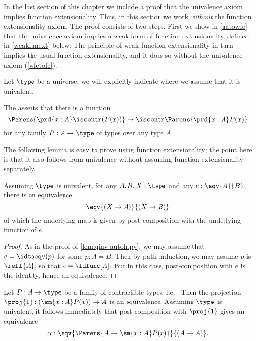 %
In the last section of this chapter we include a proof that the univalence axiom implies function
extensionality. Thus, in this section we work \emph{without} the function extensionality axiom.
The proof consists of two steps. First we show
in \cref{uatowfe} that the univalence
axiom implies a weak form of function extensionality, defined in \cref{weakfunext} below. The
principle of weak function extensionality in turn implies the usual function extensionality,
and it does so without the univalence axiom (\cref{wfetofe}).

%
Let $\type$ be a universe; we will explicitly indicate where we assume that it is univalent.

\begin{defn}\label{weakfunext}
The 
%
asserts that there is a function
\begin{equation*}
\Parens{\prd{x:A}\iscontr(P(x))} \to\iscontr\Parens{\prd{x:A}P(x)}
\end{equation*}
for any family $P:A\to\type$ of types over any type $A$.
\end{defn}

The following lemma is easy to prove using function extensionality; the point here is that it also follows from univalence without assuming function extensionality separately.

\begin{lem} \label{UA-eqv-hom-eqv}
Assuming $\type$ is univalent, for any $A,B,X:\type$ and any $e:\eqv{A}{B}$, there is an equivalence
\begin{equation*}
\eqv{(X\to A)}{(X\to B)}
\end{equation*}
of which the underlying map is given by post-composition with the underlying function of $e$.
\end{lem}

\begin{proof}
  As in the proof of \cref{lem:qinv-autohtpy}, we may assume that $e = \idtoeqv(p)$ for some $p:A=B$.
  Then by path induction, we may assume $p$ is $\refl{A}$, so that $e = \idfunc[A]$.
  But in this case, post-composition with $e$ is the identity, hence an equivalence.
\end{proof}

\begin{cor}\label{contrfamtotalpostcompequiv}
Let $P:A\to\type$ be a family of contractible types, i.e.\ 
Then the projection $\proj{1}:(\sm{x:A}P(x))\to A$ is an equivalence. Assuming $\type$ is univalent, it follows immediately that post-composition with $\proj{1}$ gives an equivalence
\begin{equation*}
\alpha : \eqv{\Parens{A\to\sm{x:A}P(x)}}{(A\to A)}.
\end{equation*}
\end{cor}

